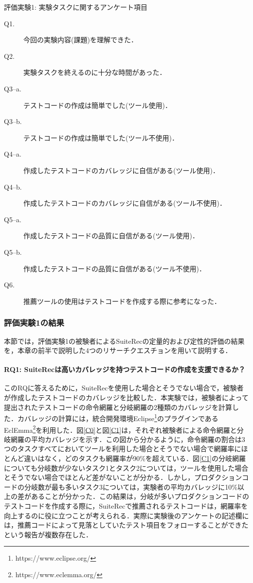 \documentclass[12pt]{jarticle} %
\begin{document}
\begin{itembox}[l]{評価実験1: 実験タスクに関するアンケート項目}
\begin{description}
\item[Q1.]今回の実験内容(課題)を理解できた．
\item[Q2.]実験タスクを終えるのに十分な時間があった．
\item[Q3--a.]テストコードの作成は簡単でした(ツール使用)．
\item[Q3--b.]テストコードの作成は簡単でした(ツール不使用)．
\item[Q4--a.]作成したテストコードのカバレッジに自信がある(ツール使用)．
\item[Q4--b.]作成したテストコードのカバレッジに自信がある(ツール不使用)．
\item[Q5--a.]作成したテストコードの品質に自信がある(ツール使用)．
\item[Q5--b.]作成したテストコードの品質に自信がある(ツール不使用)．
\item[Q6.]推薦ツールの使用はテストコードを作成する際に参考になった．
\end{description}

\end{itembox}

\newpage
\subsubsection{評価実験1の結果}
\label{sec:E1evaluation}
本節では，評価実験1の被験者による{\sf SuiteRec}の定量的および定性的評価の結果を，本章の前半で説明した4つのリサーチクエスチョンを用いて説明する．

\paragraph{RQ1: {\sf SuiteRec}は高いカバレッジを持つテストコードの作成を支援できるか？}このRQに答えるために，{\sf SuiteRec}を使用した場合とそうでない場合で，被験者が作成したテストコードのカバレッジを比較した．本実験では，被験者によって提出されたテストコードの命令網羅と分岐網羅の2種類のカバレッジを計算した．カバレッジの計算には，統合開発環境Eclipse\footnote{https://www.eclipse.org/}のプラグインであるEclEmma\footnote{https://www.eclemma.org/}を利用した．図\ref{C0}と図\ref{C1}は，それぞれ被験者による命令網羅と分岐網羅の平均カバレッジを示す．この図から分かるように，命令網羅の割合は3つのタスクすべてにおいてツールを利用した場合とそうでない場合で網羅率にほとんど違いはなく，どのタスクも網羅率が90\%を超えている．図\ref{C1}の分岐網羅についても分岐数が少ないタスク1とタスク2については，ツールを使用した場合とそうでない場合でほとんど差がないことが分かる．しかし，プロダクションコードの分岐数が最も多いタスク3については，実験者の平均カバレッジに10\%以上の差があることが分かった．この結果は，分岐が多いプロダクションコードのテストコードを作成する際に，{\sf SuiteRec}で推薦されるテストコードは，網羅率を向上するのに役に立つことが考えられる．実際に実験後のアンケートの記述欄には，推薦コードによって見落としていたテスト項目をフォローすることができたという報告が複数存在した．
\end{document}
